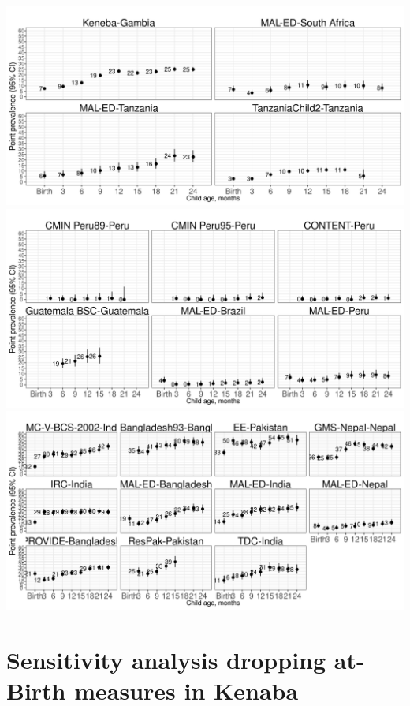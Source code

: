 \documentclass[
  9pt,
]{book}
\begin{document}
\includegraphics[width=41.67in]{figures//wasting/fig-underweight_plot_africa}
\includegraphics[width=41.67in]{figures//wasting/fig-underweight_plot_lam}
\includegraphics[width=41.67in]{figures//wasting/fig-underweight_plot_sasia}

\hypertarget{no-kenaba}{%
\chapter{Sensitivity analysis dropping at-Birth measures in Kenaba}\label{no-kenaba}}

\raggedright
\end{document}
